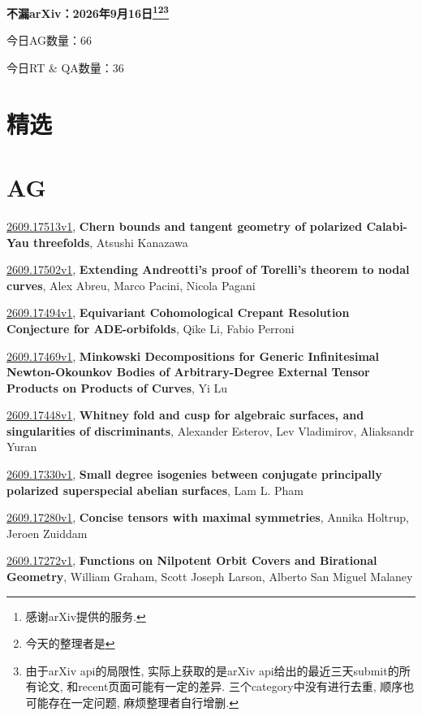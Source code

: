 \documentclass[9pt, a4paper]{article}
\theoremstyle{plain}
\theoremstyle{definition}
\theoremstyle{remark}
\newcommand{\arxiv}[3]{\href{https://arxiv.org/abs/#1}{#1}, \textbf{\textcolor{arxivblue}{#2}}, #3}
\newcommand{\AGnumber}{66}
\newcommand{\RTQAnumber}{36}
\newcommand{\NewestDate}{2026年9月16日}
\newcommand{\todayarXiver}{} %
\begin{document}
\begin{center}
    \Huge\textbf{不漏arXiv：\NewestDate\footnote{感谢arXiv提供的服务.}\footnote{今天的整理者是\todayarXiver}\footnote{由于arXiv api的局限性, 实际上获取的是arXiv api给出的最近三天submit的所有论文, 和recent页面可能有一定的差异. 三个category中没有进行去重, 顺序也可能存在一定问题, 麻烦整理者自行增删.}} \\
\end{center}

\setcounter{section}{-1}

\begin{center}
    今日AG数量：\AGnumber
    
    今日RT \& QA数量：\RTQAnumber
    
\end{center}


\section{精选}


\section{AG}
\arxiv{2609.17513v1}{Chern bounds and tangent geometry of polarized Calabi-Yau threefolds}{Atsushi Kanazawa}

\arxiv{2609.17502v1}{Extending Andreotti's proof of Torelli's theorem to nodal curves}{Alex Abreu, Marco Pacini, Nicola Pagani}

\arxiv{2609.17494v1}{Equivariant Cohomological Crepant Resolution Conjecture for ADE-orbifolds}{Qike Li, Fabio Perroni}

\arxiv{2609.17469v1}{Minkowski Decompositions for Generic Infinitesimal Newton-Okounkov Bodies of Arbitrary-Degree External Tensor Products on Products of Curves}{Yi Lu}

\arxiv{2609.17448v1}{Whitney fold and cusp for algebraic surfaces, and singularities of discriminants}{Alexander Esterov, Lev Vladimirov, Aliaksandr Yuran}

\arxiv{2609.17330v1}{Small degree isogenies between conjugate principally polarized superspecial abelian surfaces}{Lam L. Pham}

\arxiv{2609.17280v1}{Concise tensors with maximal symmetries}{Annika Holtrup, Jeroen Zuiddam}

\arxiv{2609.17272v1}{Functions on Nilpotent Orbit Covers and Birational Geometry}{William Graham, Scott Joseph Larson, Alberto San Miguel Malaney}
\end{document}

